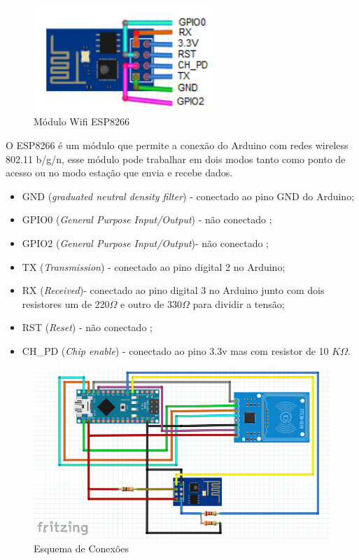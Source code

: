 
\begin{figure}[H]
              \caption{\label{fig:moduloWii}{Módulo Wifi ESP8266}}
              \centering
              \includegraphics[width=0.6\textwidth]{Figuras/Modulo_ESP8266.png}
\end{figure}

\par
O ESP8266 é um módulo que permite a conexão do Arduino com redes wireless 802.11 b/g/n, esse módulo pode 
trabalhar em dois modos tanto como ponto de acesso ou no modo estação que envia e recebe dados. 
\begin{itemize}
    \item GND (\textit{graduated neutral density filter}) - conectado ao pino GND do Arduino;
    \item GPIO0 (\textit{General Purpose Input/Output}) - não conectado ;
    \item GPIO2 (\textit{General Purpose Input/Output})- não conectado ; 
    \item TX (\textit{Transmission}) - conectado ao pino digital 2 no Arduino;
    \item RX (\textit{Received})- conectado ao pino digital 3 no Arduino junto com dois resistores um de 220$\Omega$ e outro de 330$\Omega$ para dividir a tensão;
    \item RST (\textit{Reset}) - não conectado ;
    \item CH\_PD (\textit{Chip enable}) - conectado ao pino 3.3v mas com resistor de 10 $K\Omega$.
\end{itemize}


\begin{figure}[H]
              \caption{\label{fig:esq_conexoes}{Esquema de Conexões}}
              \centering
              \includegraphics[width=1\textwidth]{Figuras/esquema_de_conexoes2.PNG}
\end{figure}
